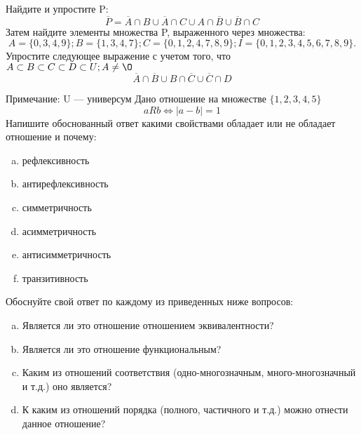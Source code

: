 \documentclass[10pt]{exam}
\begin{document}
\begin{questions}
\question
Найдите и упростите P:
\begin{equation*}
\overline{P} = \overline{A} \cap B \cup \overline{A} \cap C \cup A \cap \overline{B} \cup \overline{B} \cap C
\end{equation*}
Затем найдите элементы множества P, выраженного через множества:
\begin{equation*}
A = \{0, 3, 4, 9\}; 
B = \{1, 3, 4, 7\};
C = \{0, 1, 2, 4, 7, 8, 9\};
I = \{0, 1, 2, 3, 4, 5, 6, 7, 8, 9\}.
\end{equation*}\question
Упростите следующее выражение с учетом того, что $A\subset B \subset C \subset D \subset U; A \neq \O$
\begin{equation*}
\overline{A} \cap \overline{B} \cup B \cap \overline{C} \cup \overline{C} \cap D
\end{equation*}

Примечание: U — универсум\question
Дано отношение на множестве $\{1, 2, 3, 4, 5\}$ 
\begin{equation*}
aRb \iff |a-b| = 1
\end{equation*}
Напишите обоснованный ответ какими свойствами обладает или не обладает отношение и почему:   
\begin{enumerate} [a)]\setcounter{enumi}{0}
\item рефлексивность
\item антирефлексивность
\item симметричность
\item асимметричность
\item антисимметричность
\item транзитивность
\end{enumerate}

Обоснуйте свой ответ по каждому из приведенных ниже вопросов:
\begin{enumerate} [a)]\setcounter{enumi}{0}
    \item Является ли это отношение отношением эквивалентности?
    \item Является ли это отношение функциональным?
    \item Каким из отношений соответствия (одно-многозначным, много-многозначный и т.д.) оно является?
    \item К каким из отношений порядка (полного, частичного и т.д.) можно отнести данное отношение?
\end{enumerate}


\end{questions}
\end{document}
